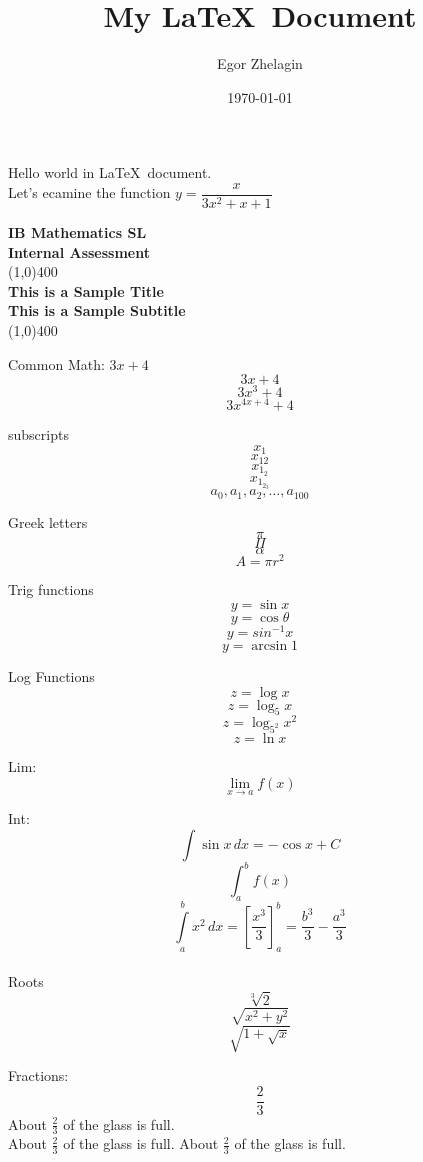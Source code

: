 \documentclass[11pt,  a4paper]{article}
\title{My \LaTeX\ Document}
\author{Egor Zhelagin}
\date{\today} %
\def\eq1{y=\dfrac{x}{3x^2+x+1}}
\begin{document}
\maketitle

Hello world in \LaTeX\ document.\\
Let's ecamine the function $\eq1$

\begin{titlepage}
\begin{center}
\vspace*{1cm}
\Large{\textbf{IB Mathematics SL}}\\
\Large{\textbf{Internal Assessment}}\\
\vfill
\line(1,0){400}\\[1mm]
\huge{\textbf{This is a Sample Title}}\\[3mm]
\Large{\textbf{This is a Sample Subtitle}}\\[1mm]
\line(1,0){400}\\[1mm]
\vfill
\end{center}
\end{titlepage}

\tableofcontents
\thispagestyle{empty} %
\clearpage

\setcounter{page}{1}

Common Math:
$3x+4$
$$3x+4$$
$$3x^3+4$$
$$3x^{4x+4}+4$$

subscripts
$$x_1$$
$$x_{12}$$
$$x_{1_2}$$
$$x_{1_{2_3}}$$
$$a_0,a_1,a_2,  \ldots,  a_{100}$$

Greek letters
$$\pi$$
$$\Pi$$
$$\alpha$$
$$A=\pi r^2$$ %

Trig functions 
$$ y=\sin x$$
$$y=\cos\theta$$
$$y=sin^{-1}x$$
$$y=\arcsin 1$$

Log Functions
$$z=\log x$$
$$z=\log_5 x$$
$$z=\log_{5^2} x^2$$
$$z=\ln x$$

Lim:
$$\lim\limits_{x\to a}f(x)$$

Int:
$$\int\sin x\,dx = -\cos x +C $$
$$\int_a^b f(x)$$
$$\displaystyle{\int \limits_{a}^{b} x^2 \,dx = \left[\frac{x^3}{3}\right]_{a}^{b}=\frac{b^3}{3}-\frac{a^3}{3}}$$\\

Roots
$$\sqrt[3]{2}$$
$$\sqrt{x^2+y^2}$$
$$\sqrt{1+\sqrt{x}}$$

Fractions:
$$\frac{2}{3}$$
About $\displaystyle \frac{2}{3}$ of the glass is full.\\[4pt] %
About $\frac{2}{3}$ of the glass is full.
About $\frac{2}{3}$ of the glass is full. 
\end{document}
